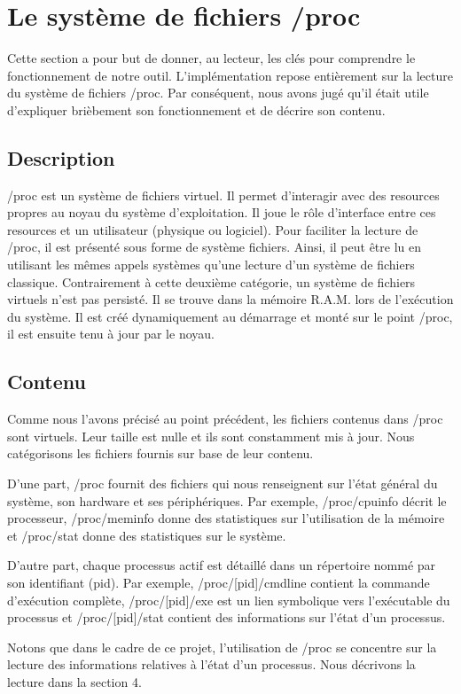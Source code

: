 \section{Le système de fichiers /proc}
Cette section a pour but de donner, au lecteur, les clés pour comprendre le fonctionnement de notre outil. L'implémentation repose entièrement sur la lecture du système de fichiers /proc. Par conséquent, nous avons jugé qu'il était utile d'expliquer brièbement son fonctionnement et de décrire son contenu.

\subsection{Description}
/proc est un système de fichiers virtuel. Il permet d'interagir avec des resources propres au noyau du système d'exploitation. Il joue le rôle d'interface entre ces resources et un utilisateur (physique ou logiciel). Pour faciliter la lecture de /proc, il est présenté sous forme de système fichiers. Ainsi, il peut être lu en utilisant les mêmes appels systèmes qu'une lecture d'un système de fichiers classique. Contrairement à cette deuxième catégorie, un système de fichiers virtuels n'est pas persisté. Il se trouve dans la mémoire R.A.M. lors de l'exécution du système. Il est créé dynamiquement au démarrage et monté sur le point /proc, il est ensuite tenu à jour par le noyau.

\subsection{Contenu}
Comme nous l'avons précisé au point précédent, les fichiers contenus dans /proc sont virtuels. Leur taille est nulle et ils sont constamment mis à jour. Nous catégorisons les fichiers fournis sur base de leur contenu.

D'une part, /proc fournit des fichiers qui nous renseignent sur l'état général du système, son hardware et ses périphériques. Par exemple, /proc/cpuinfo décrit le processeur, /proc/meminfo donne des statistiques sur l'utilisation de la mémoire et /proc/stat donne des statistiques sur le système. 

D'autre part, chaque processus actif est détaillé dans un répertoire nommé par son identifiant (pid). Par exemple, /proc/[pid]/cmdline contient la commande d'exécution complète, /proc/[pid]/exe est un lien symbolique vers l'exécutable du processus et /proc/[pid]/stat contient des informations sur l'état d'un processus.

Notons que dans le cadre de ce projet, l'utilisation de /proc se concentre sur la lecture des informations relatives à l'état d'un processus. Nous décrivons la lecture dans la section 4.